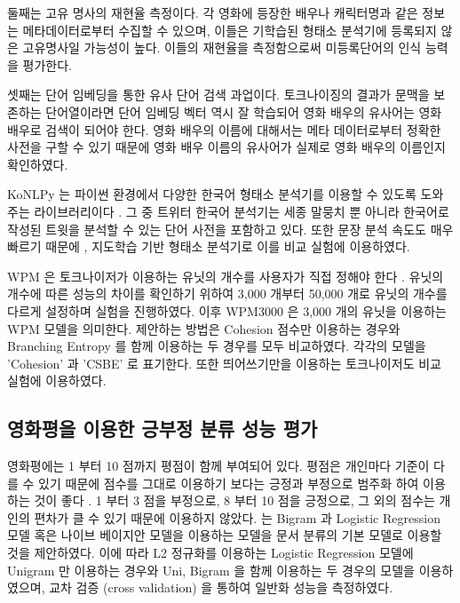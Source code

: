\documentclass[oneside, ko,phd]{snuthesis_utf8_kor}
\begin{document}
둘째는 고유 명사의 재현율 측정이다.
각 영화에 등장한 배우나 캐릭터명과 같은 정보는 메타데이터로부터 수집할 수 있으며, 이들은 기학습된 형태소 분석기에 등록되지 않은 고유명사일 가능성이 높다.
이들의 재현율을 측정함으로써 미등록단어의 인식 능력을 평가한다.

셋째는 단어 임베딩을 통한 유사 단어 검색 과업이다.
토크나이징의 결과가 문맥을 보존하는 단어열이라면 단어 임베딩 벡터 역시 잘 학습되어 영화 배우의 유사어는 영화 배우로 검색이 되어야 한다.
영화 배우의 이름에 대해서는 메타 데이터로부터 정확한 사전을 구할 수 있기 때문에 영화 배우 이름의 유사어가 실제로 영화 배우의 이름인지 확인하였다.

KoNLPy 는 파이썬 환경에서 다양한 한국어 형태소 분석기를 이용할 수 있도록 도와주는 라이브러리이다 \cite{konlpy}.
그 중 트위터 한국어 분석기는 세종 말뭉치 뿐 아니라 한국어로 작성된 트윗을 분석할 수 있는 단어 사전을 포함하고 있다.
또한 문장 분석 속도도 매우 빠르기 때문에 \cite{konlpy}, 지도학습 기반 형태소 분석기로 이를 비교 실험에 이용하였다.

WPM 은 토크나이저가 이용하는 유닛의 개수를 사용자가 직접 정해야 한다 \cite{wu2016google}.
유닛의 개수에 따른 성능의 차이를 확인하기 위하여 3,000 개부터 50,000 개로 유닛의 개수를 다르게 설정하며 실험을 진행하였다.
이후 WPM3000 은 3,000 개의 유닛을 이용하는 WPM 모델을 의미한다.
제안하는 방법은 Cohesion 점수만 이용하는 경우와 Branching Entropy 를 함께 이용하는 두 경우를 모두 비교하였다.
각각의 모델을 'Cohesion' 과 'CSBE' 로 표기한다.
또한 띄어쓰기만을 이용하는 토크나이저도 비교 실험에 이용하였다.

\subsection{영화평을 이용한 긍부정 분류 성능 평가}
영화평에는 1 부터 10 점까지 평점이 함께 부여되어 있다.
평점은 개인마다 기준이 다를 수 있기 때문에 점수를 그대로 이용하기 보다는 긍정과 부정으로 범주화 하여 이용하는 것이 좋다 \cite{pang2008opinion, pang2002thumbs}.
1 부터 3 점을 부정으로, 8 부터 10 점을 긍정으로, 그 외의 점수는 개인의 편차가 클 수 있기 때문에 이용하지 않았다.
\cite{wang2012baselines, joulin2016bag} 는 Bigram 과 Logistic Regression 모델 혹은 나이브 베이지안 모델을 이용하는 모델을 문서 분류의 기본 모델로 이용할 것을 제안하였다.
이에 따라 L2 정규화를 이용하는 Logistic Regression 모델에 Unigram 만 이용하는 경우와 Uni, Bigram 을 함께 이용하는 두 경우의 모델을 이용하였으며, 교차 검증 (cross validation) 을 통하여 일반화 성능을 측정하였다.
\end{document}
